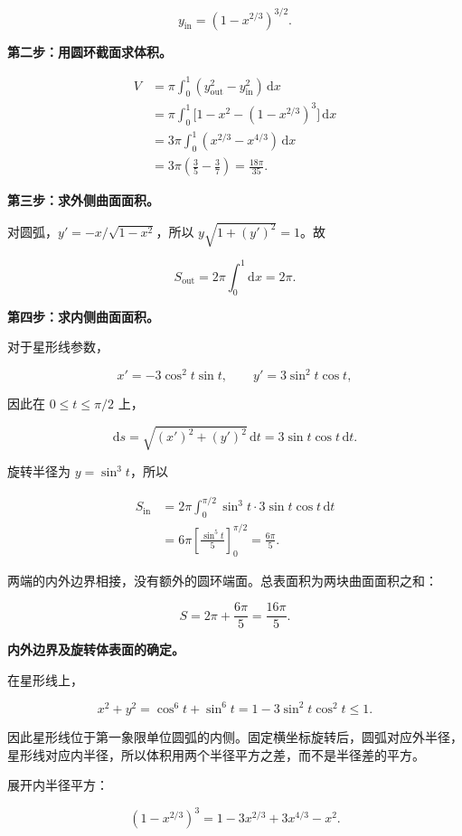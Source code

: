 \documentclass[UTF8,11pt,fontset=windows]{ctexart}
\begin{document}
$$
y_{\mathrm{in}}=(1-x^{2/3})^{3/2}.
$$

\textbf{第二步：用圆环截面求体积。}

$$
\begin{aligned}
V&=\pi\int_0^1(y_{\mathrm{out}}^2-y_{\mathrm{in}}^2)\,\mathrm dx\\
&=\pi\int_0^1\bigl[1-x^2-(1-x^{2/3})^3\bigr]\,\mathrm dx\\
&=3\pi\int_0^1(x^{2/3}-x^{4/3})\,\mathrm dx\\
&=3\pi\left(\frac35-\frac37\right)=\frac{18\pi}{35}.
\end{aligned}
$$

\textbf{第三步：求外侧曲面面积。}

对圆弧，$y'=-x/\sqrt{1-x^2}$，所以 $y\sqrt{1+(y')^2}=1$。故

$$
S_{\mathrm{out}}=2\pi\int_0^1\mathrm dx=2\pi.
$$

\textbf{第四步：求内侧曲面面积。}

对于星形线参数，

$$
x'=-3\cos^2t\sin t,
\qquad y'=3\sin^2t\cos t,
$$

因此在 $0\le t\le\pi/2$ 上，

$$
\mathrm ds=\sqrt{(x')^2+(y')^2}\,\mathrm dt
=3\sin t\cos t\,\mathrm dt.
$$

旋转半径为 $y=\sin^3t$，所以

$$
\begin{aligned}
S_{\mathrm{in}}&=2\pi\int_0^{\pi/2}\sin^3t\cdot3\sin t\cos t\,\mathrm dt\\
&=6\pi\left[\frac{\sin^5t}{5}\right]_0^{\pi/2}
=\frac{6\pi}{5}.
\end{aligned}
$$

两端的内外边界相接，没有额外的圆环端面。总表面积为两块曲面面积之和：

$$
S=2\pi+\frac{6\pi}{5}=\frac{16\pi}{5}.
$$

\textbf{内外边界及旋转体表面的确定。}

在星形线上，

$$
x^2+y^2=\cos^6t+\sin^6t
=1-3\sin^2t\cos^2t\le1.
$$

因此星形线位于第一象限单位圆弧的内侧。固定横坐标旋转后，圆弧对应外半径，星形线对应内半径，所以体积用两个半径平方之差，而不是半径差的平方。

展开内半径平方：

$$
(1-x^{2/3})^3=1-3x^{2/3}+3x^{4/3}-x^2.
$$
\end{document}
